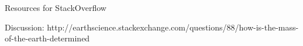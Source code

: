 Resources for StackOverflow

Discussion:
http://earthscience.stackexchange.com/questions/88/how-is-the-mass-of-the-earth-determined

